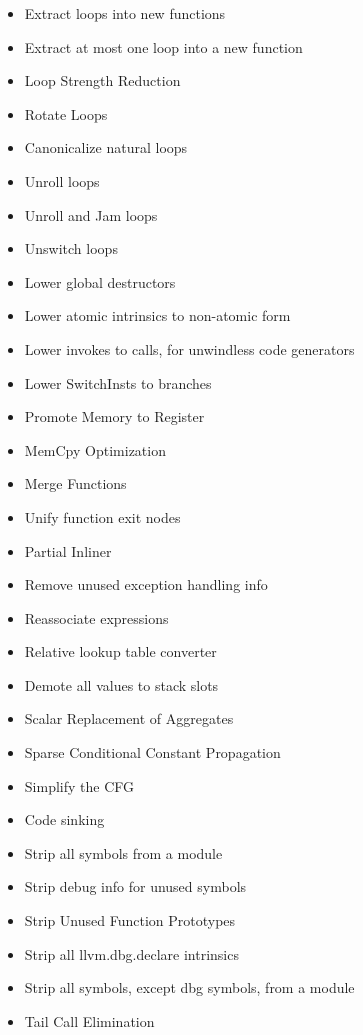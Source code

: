 \begin{multicols}{3}
\begin{itemize}
     \item Extract loops into new functions
     \item Extract at most one loop into a new function
     \item Loop Strength Reduction
     \item Rotate Loops
     \item Canonicalize natural loops
     \item Unroll loops
     \item Unroll and Jam loops
     \item Unswitch loops
     \item Lower global destructors
     \item Lower atomic intrinsics to non-atomic form
     \item Lower invokes to calls, for unwindless code generators
     \item Lower SwitchInsts to branches
     \item Promote Memory to Register
     \item MemCpy Optimization
     \item Merge Functions
     \item Unify function exit nodes
     \item Partial Inliner
     \item Remove unused exception handling info
     \item Reassociate expressions
     \item Relative lookup table converter
     \item Demote all values to stack slots
     \item Scalar Replacement of Aggregates
     \item Sparse Conditional Constant Propagation
     \item Simplify the CFG
     \item Code sinking
     \item Strip all symbols from a module
     \item Strip debug info for unused symbols
     \item Strip Unused Function Prototypes
     \item Strip all llvm.dbg.declare intrinsics
     \item Strip all symbols, except dbg symbols, from a module
     \item Tail Call Elimination

\end{itemize}
\end{multicols}

